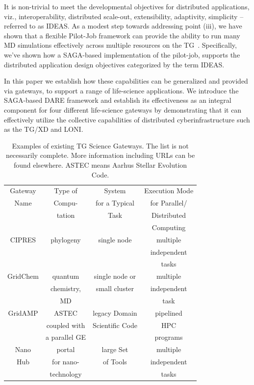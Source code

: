 \documentclass{sig-alternate}
\begin{document}
It is non-trivial to meet the developmental objectives for distributed
applications, viz., interoperability, distributed scale-out,
extensibility, adaptivity, simplicity -- referred to as
IDEAS\cite{ideas}.  As a modest step towards addressing point (iii),
we have shown that a flexible Pilot-Job framework can provide the
ability to run many MD simulations effectively across multiple
resources on the TG~\cite{saga-royalsoc, saga-ccgrid10}.
Specifically, we've shown how a SAGA-based implementation of the
pilot-job, supports the distributed application design objectives
categorized by the term IDEAS\cite{ideas}.

In this paper we establish how these capabilities can be generalized
and provided via gateways, to support a range of life-science
applications.  We introduce the SAGA-based DARE framework and
establish its effectiveness as an integral component for four
different life-science gateways by demonstrating that it can
effectively utilize the collective capabilities of distributed
cyberinfrastructure such as the TG/XD and LONI.

\begin{table}
 \small
\begin{tabular}{|c|c|c|c|} 
  \hline Gateway  & Type of & System  & Execution Mode 
  \\
  Name & Compu- & for a Typical & for Parallel/ \\ 
  &  tation & Task & Distributed \\
  & & & Computing \\  \hline \hline 
  
  CIPRES   & phylogeny  &  single node  & multiple  \\
   &  &   & independent   \\ 
  &  &  &  tasks \\  \hline
  GridChem   & quantum & single node or     & multiple  \\
     & chemistry, & small cluster & independent   \\
  & MD &  & task  \\ \hline
   GridAMP     & ASTEC  & legacy Domain  & pipelined \\ 
  & coupled with  &  Scientific Code   & HPC  \\
  & a parallel GE &   &  programs \\ \hline
  Nano  & portal  & large Set   & multiple \\
  Hub  & for nano- & of Tools  & independent \\
   & technology &  & tasks \\ \hline
  \hline
\end{tabular} \caption{Examples of existing TG Science Gateways. The list is not necessarily complete. More information including URLs can be found elsewhere\cite{tg-sg-list-url}.  ASTEC means Aarhus Stellar Evolution Code.}
 \label{table:TG-sg} 
\end{table}
\end{document}
